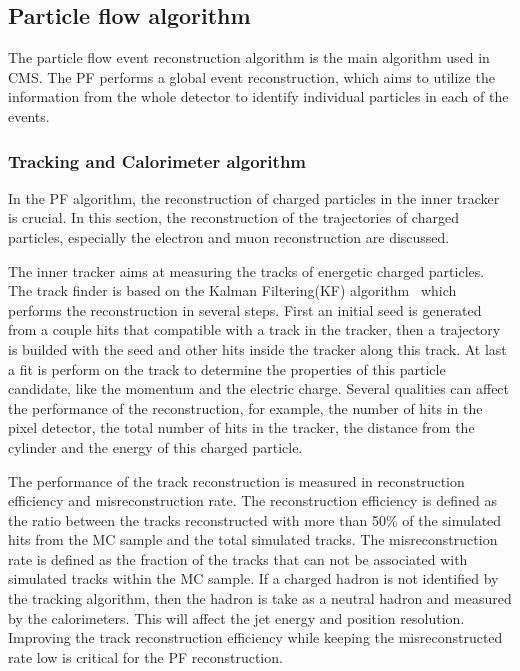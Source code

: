 \subsection{Particle flow algorithm}

The particle flow event reconstruction algorithm is the main algorithm used in CMS. The PF performs a global event reconstruction, which aims to utilize the information from the whole detector to identify individual particles in each of the events.



\subsubsection{Tracking and Calorimeter algorithm}\label{PFtracker}

In the PF algorithm, the reconstruction of charged particles in the inner tracker is crucial. In this section, the reconstruction of the trajectories of charged particles, especially the electron and muon reconstruction are discussed. 

The inner tracker aims at measuring the tracks of energetic charged particles. The track finder is based on the Kalman Filtering(KF) algorithm~\cite{tracker:algo} which performs the reconstruction in several steps. First an initial seed is generated from a couple hits that compatible with a track in the tracker, then a trajectory is builded with the seed and other hits inside the tracker along this track. At last a fit is perform on the track  to determine the properties of this particle candidate, like the momentum and the electric charge. Several qualities can affect the performance of the reconstruction, for example,  the number of hits in the pixel detector, the total number of hits in the tracker, the distance from the cylinder and the energy of this charged particle. 

The performance of the track reconstruction is measured in reconstruction efficiency and misreconstruction rate. The reconstruction efficiency is defined as the ratio between the tracks reconstructed with more than 50\% of the simulated hits from the MC sample and the total simulated tracks. The misreconstruction rate is defined as the fraction of the tracks that can not be associated with simulated tracks within the MC sample.  If a charged hadron is not identified by the tracking algorithm, then the hadron is take as a neutral hadron and measured by the calorimeters. This will affect the jet energy and position resolution. Improving the track reconstruction efficiency while keeping the misreconstructed rate low is critical for the PF reconstruction.

